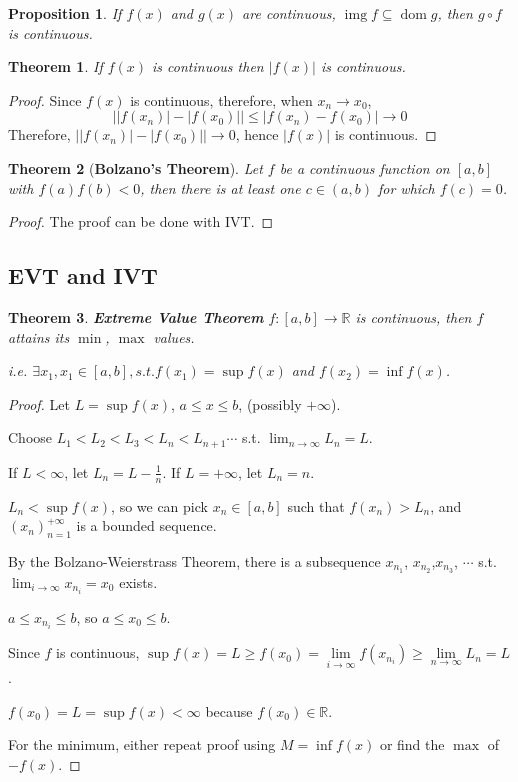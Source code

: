 \documentclass[12pt]{article}
\newcommand{\abs}[1]{\left| #1 \right|}
\theoremstyle{plain}
\newtheorem{theorem}{Theorem}[subsection]
\newtheorem{proposition}{Proposition}[subsection]
\newcommand{\dlim}{\displaystyle\lim\limits}
\DeclareMathOperator{\Dom}{dom}
\DeclareMathOperator{\Img}{img}
\begin{document}
    \begin{proposition}
        If $f(x)$ and $g(x)$ are continuous, 
        $\Img f \subseteq \Dom g$, then $g \circ f$ is continuous.\\
    \end{proposition}

		\begin{theorem}
    	If $f(x)$ is continuous then $\abs{f(x)}$ is continuous.
    \end{theorem}
		\begin{proof}
			Since $f(x)$ is continuous, therefore, when $x_n\to x_0$, 
			\[
				\abs{\abs{f(x_n)}-\abs{f(x_0)}} \leq \abs{f(x_n)-f(x_0)}\to 0
			\]
			Therefore, $\abs{\abs{f(x_n)}-\abs{f(x_0)}}\to 0$, hence $\abs{f(x)}$ is 
			continuous.
		\end{proof}
    \begin{theorem}[\textbf{Bolzano's Theorem}]
			Let $f$ be a continuous function on $[a,b]$ with $f(a)f(b)<0$, then there
			is at least one $c\in(a,b)$ for which $f(c)=0$.
    \end{theorem}
    \begin{proof}
    	The proof can be done with IVT.
    \end{proof}


\newpage
	\subsection{EVT and IVT}
    {\color{Blue}
	 \begin{theorem}{\textbf{Extreme Value Theorem}}
        $f:[a,b]\to \mathbb{R}$ is continuous, 
        then $f$ attains its $\min$, $\max$ values.
    
        i.e. $\exists x_1, x_1\in [a,b], s.t. f(x_1)=\sup f(x)$ and 
        $f(x_2) = \inf f(x)$.
    \end{theorem}
    \begin{proof}
        Let $L =\sup f(x)$, $a\leq x\leq b$, (possibly $+\infty$).

        Choose $L_1<L_2<L_3<L_n<L_{n+1}\cdots$ s.t. $\lim_{n\to\infty} L_n=L$. 

        If $L<\infty$, let $L_n=L-\frac 1n$. If $L=+\infty$, let $L_n=n$.

        $L_n<\sup f(x)$, so we can pick $x_n \in [a, b]$ such that 
        $f(x_n) > L_n$, 
        and $(x_n)_{n=1}^{+\infty}$ is a bounded sequence.

        By the Bolzano-Weierstrass Theorem, there is a subsequence 
        $x_{n_1}$, $x_{n_2}$,$x_{n_3}$, $\cdots$ s.t. 
        $\lim_{i\to\infty} x_{n_i}=x_0$ exists.

        $a\leq x_{n_i}\leq b$, so $a\leq x_0\leq b$. 
         
        Since $f$ is continuous,
        $\sup f(x)= L\geq f(x_0)=\dlim_{i\to\infty} f(x_{n_i})\geq
        \dlim_{n\to\infty}L_n=L$.

        $f(x_0) = L = \sup f(x)<\infty$ because $f(x_0)\in\mathbb{R}$.

        For the minimum, either repeat proof using $M=\inf f(x)$ 
        or find the $\max$ of $-f(x)$. 
        
    \end{proof}}
\end{document}

